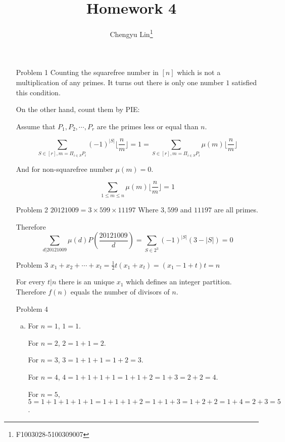 \documentclass{article}
\title{Homework 4}
\author{Chengyu Lin\footnote{F1003028-5100309007}}
\date{}
\begin{document}
\maketitle

\begin{itemize}
    \item[Problem 1]
        Counting the squarefree number in $[n]$ which is not a multiplication of
        any primes. It turns out there is only one number $1$ satisfied
        this condition.

        On the other hand, count them by PIE:

        Assume that $P_1, P_2, \cdots, P_r$ are the primes less or equal than $n$.

        $$\sum_{S \in [r], m = \Pi_{i \in S}P_i} (-1)^{|S|} \lfloor \frac{n}{m}\rfloor = 1 =
        \sum_{S \in [r], m = \Pi_{i \in S}P_i} \mu(m) \lfloor \frac{n}{m}\rfloor $$

        And for non-squarefree number $\mu(m) = 0$.

        $$\sum_{1\le m \le n} \mu(m) \lfloor \frac{n}{m} \rfloor = 1$$

    \item[Problem 2]
        $20121009 = 3 \times 599 \times 11197$
        Where $3, 599$ and $11197$ are all primes.

        Therefore 
        $$\sum_{d|20121009} \mu(d)P(\frac{20121009}{d}) = \sum_{S \in 2^3} (-1)^{|S|} (3 - |S|) = 0$$

    \item[Problem 3]
        $x_1 + x_2 + \cdots + x_t = \frac{1}{2}t(x_1 + x_t) = (x_1 - 1 + t)t = n$

        For every $t | n$ there is an unique $x_1$ which defines an integer partition.
        Therefore $f(n)$ equals the number of divisors of $n$.

    \item[Problem 4]
        \begin{enumerate}[(a)]
            \item
                For $n=1$, $1=1$.

                For $n=2$, $2 = 1 + 1 = 2$.

                For $n=3$, $3 = 1 + 1 + 1 = 1 + 2 = 3$.

                For $n=4$, $4 = 1 + 1 + 1 + 1 = 1 + 1 + 2 = 1 + 3 = 2 + 2 = 4$.

                For $n=5$, $5 = 1 + 1 + 1 + 1 + 1 = 1 + 1 + 1 + 2 = 1 + 1 + 3 = 1 + 2 + 2 = 1 + 4 = 2 + 3 = 5$.


\end{enumerate}
\end{itemize}
\end{document}
